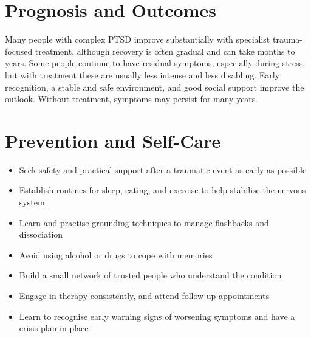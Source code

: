 \section*{Prognosis and Outcomes}
Many people with complex PTSD improve substantially with specialist trauma-focused treatment, although recovery is often gradual and can take months to years. Some people continue to have residual symptoms, especially during stress, but with treatment these are usually less intense and less disabling. Early recognition, a stable and safe environment, and good social support improve the outlook. Without treatment, symptoms may persist for many years.

\section*{Prevention and Self-Care}
\begin{itemize}
    \item Seek safety and practical support after a traumatic event as early as possible
    \item Establish routines for sleep, eating, and exercise to help stabilise the nervous system
    \item Learn and practise grounding techniques to manage flashbacks and dissociation
    \item Avoid using alcohol or drugs to cope with memories
    \item Build a small network of trusted people who understand the condition
    \item Engage in therapy consistently, and attend follow-up appointments
    \item Learn to recognise early warning signs of worsening symptoms and have a crisis plan in place
\end{itemize}
